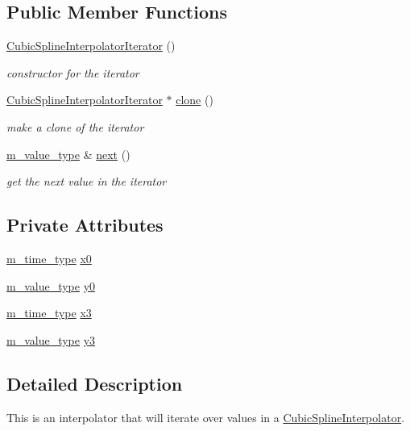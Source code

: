 \subsection*{Public Member Functions}
\begin{CompactItemize}
\item 
\hyperlink{classCubicSplineInterpolatorIterator_a0}{Cubic\-Spline\-Interpolator\-Iterator} ()
\begin{CompactList}\small\item\em constructor for the iterator \item\end{CompactList}\item 
\hyperlink{classCubicSplineInterpolatorIterator}{Cubic\-Spline\-Interpolator\-Iterator} $\ast$ \hyperlink{classCubicSplineInterpolatorIterator_a1}{clone} ()
\begin{CompactList}\small\item\em make a clone of the iterator \item\end{CompactList}\item 
\hyperlink{Types_8h_a3}{m\_\-value\_\-type} \& \hyperlink{classCubicSplineInterpolatorIterator_a2}{next} ()
\begin{CompactList}\small\item\em get the next value in the iterator \item\end{CompactList}\end{CompactItemize}
\subsection*{Private Attributes}
\begin{CompactItemize}
\item 
\hyperlink{Types_8h_a2}{m\_\-time\_\-type} \hyperlink{classCubicSplineInterpolatorIterator_r0}{x0}
\item 
\hyperlink{Types_8h_a3}{m\_\-value\_\-type} \hyperlink{classCubicSplineInterpolatorIterator_r1}{y0}
\item 
\hyperlink{Types_8h_a2}{m\_\-time\_\-type} \hyperlink{classCubicSplineInterpolatorIterator_r2}{x3}
\item 
\hyperlink{Types_8h_a3}{m\_\-value\_\-type} \hyperlink{classCubicSplineInterpolatorIterator_r3}{y3}
\end{CompactItemize}


\subsection{Detailed Description}
This is an interpolator that will iterate over values in a \hyperlink{classCubicSplineInterpolator}{Cubic\-Spline\-Interpolator}. 



